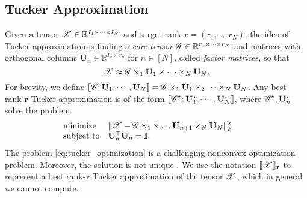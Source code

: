 \subsection{Tucker Approximation}
Given a tensor $\T{X}\in\mathbb{R}^{I_1\times \dots \times I_N}$
and target rank $\mathbf{r}=(r_1,\dots, r_N)$,
the idea of Tucker approximation is finding a \emph{core tensor}
$\T{G}\in \mathbb{R}^{r_1 \times \cdots \times r_N}$
and matrices with  orthogonal columns $\mathbf{U}_n \in \mathbb{R}^{I_n \times r_n}$ for $n\in [N]$,
called \emph{factor matrices}, so that
\begin{equation}
\T{X} \approx \T{G}\times_1 \mathbf{U}_1 \times \cdots \times_N \mathbf{U}_N. \nonumber
\end{equation}
For brevity, we define
$\llbracket\T{G}; \mathbf{U}_1, \cdots, \mathbf{U}_N \rrbracket
= \T{G}\times_1 \mathbf{U}_1\times_2 \cdots\times_N \mathbf{U}_N$.
Any best rank-$\mathbf{r}$ Tucker approximation is of the form
$\llbracket\T{G}^\star; \mathbf{U}_1^\star, \cdots, \mathbf{U}_N^\star \rrbracket$,
where $\T{G}^\star, \mathbf{U}_n^\star$ solve the problem
\begin{equation}
\begin{array}{ll}
\label{eq:tucker_optimization}
\mbox{minimize} & \|\T{X} -\T{G}\times_1 \times \dots \mathbf{U}_{n+1} \times_N \mathbf{U}_N\|_F^2 \qquad \\
\mbox{subject to} & \mathbf{U}_n^\top \mathbf{U}_n = \mathbf{I}.
\end{array}
\end{equation}
The problem \ref{eq:tucker_optimization} is a challenging nonconvex optimization problem.
Moreover, the solution is not unique \cite{kolda2009tensor}.
We use the notation $\llbracket\T{X} \rrbracket_\mathbf{r}$
to represent a best rank-$\mathbf{r}$ Tucker approximation of the tensor $\T{X}$,
which in general we cannot compute.

